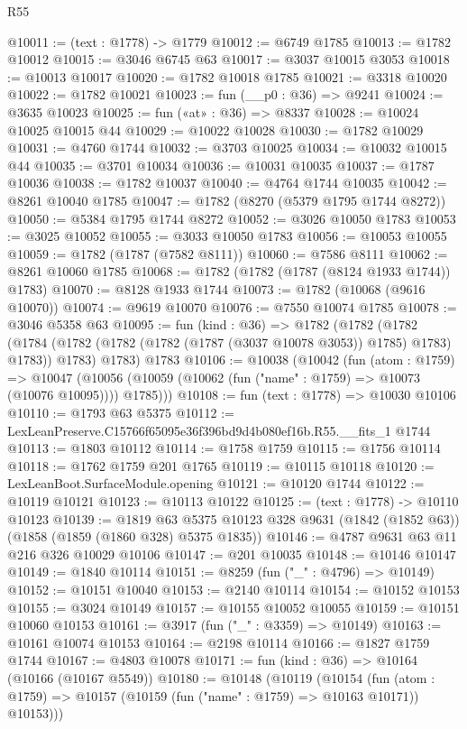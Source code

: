 \begin{lexlean}{R55}
\begin{coremodule}
@10011 := (text : @1778) -> @1779
@10012 := @6749 @1785
@10013 := @1782 @10012
@10015 := @3046 @6745 @63
@10017 := @3037 @10015 @3053
@10018 := @10013 @10017
@10020 := @1782 @10018 @1785
@10021 := @3318 @10020
@10022 := @1782 @10021
@10023 := fun (__p0 : @36) => @9241
@10024 := @3635 @10023
@10025 := fun («at» : @36) => @8337
@10028 := @10024 @10025 @10015 @44
@10029 := @10022 @10028
@10030 := @1782 @10029
@10031 := @4760 @1744
@10032 := @3703 @10025
@10034 := @10032 @10015 @44
@10035 := @3701 @10034
@10036 := @10031 @10035
@10037 := @1787 @10036
@10038 := @1782 @10037
@10040 := @4764 @1744 @10035
@10042 := @8261 @10040 @1785
@10047 := @1782 (@8270 (@5379 @1795 @1744 @8272))
@10050 := @5384 @1795 @1744 @8272
@10052 := @3026 @10050 @1783
@10053 := @3025 @10052
@10055 := @3033 @10050 @1783
@10056 := @10053 @10055
@10059 := @1782 (@1787 (@7582 @8111))
@10060 := @7586 @8111
@10062 := @8261 @10060 @1785
@10068 := @1782 (@1782 (@1787 (@8124 @1933 @1744)) @1783)
@10070 := @8128 @1933 @1744
@10073 := @1782 (@10068 (@9616 @10070))
@10074 := @9619 @10070
@10076 := @7550 @10074 @1785
@10078 := @3046 @5358 @63
@10095 := fun (kind : @36) =>
  @1782
    (@1782
      (@1782 (@1784 (@1782 (@1782 (@1782 (@1787 (@3037 @10078 @3053)) @1785) @1783) @1783)) @1783)
      @1783)
    @1783
@10106 := @10038
    (@10042
      (fun (atom : @1759) =>
      @10047 (@10056 (@10059 (@10062 (fun ("name" : @1759) => @10073 (@10076 @10095)))) @1785)))
@10108 := fun (text : @1778) => @10030 @10106
@10110 := @1793 @63 @5375
@10112 := LexLeanPreserve.C15766f65095e36f396bd9d4b080ef16b.R55.__fits_1 @1744
@10113 := @1803 @10112
@10114 := @1758 @1759
@10115 := @1756 @10114
@10118 := @1762 @1759 @201 @1765
@10119 := @10115 @10118
@10120 := LexLeanBoot.SurfaceModule.opening
@10121 := @10120 @1744
@10122 := @10119 @10121
@10123 := @10113 @10122
@10125 := (text : @1778) -> @10110 @10123
@10139 := @1819
    @63
    @5375
    @10123
    @328
    @9631
    (@1842 (@1852 @63))
    (@1858 (@1859 (@1860 @328) @5375 @1835))
@10146 := @4787 @9631 @63 @11 @216 @326 @10029 @10106
@10147 := @201 @10035
@10148 := @10146 @10147
@10149 := @1840 @10114
@10151 := @8259 (fun ("_" : @4796) => @10149)
@10152 := @10151 @10040
@10153 := @2140 @10114
@10154 := @10152 @10153
@10155 := @3024 @10149
@10157 := @10155 @10052 @10055
@10159 := @10151 @10060 @10153
@10161 := @3917 (fun ("_" : @3359) => @10149)
@10163 := @10161 @10074 @10153
@10164 := @2198 @10114
@10166 := @1827 @1759 @1744
@10167 := @4803 @10078
@10171 := fun (kind : @36) => @10164 (@10166 (@10167 @5549))
@10180 := @10148
    (@10119
      (@10154
        (fun (atom : @1759) => @10157 (@10159 (fun ("name" : @1759) => @10163 @10171)) @10153)))

\end{coremodule}
\end{lexlean}
